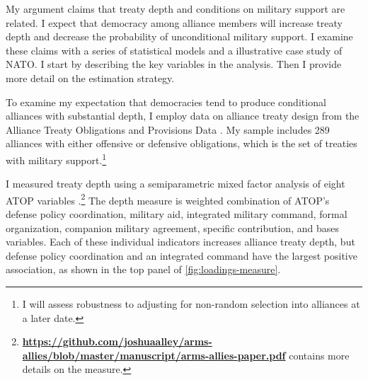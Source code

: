 \documentclass[12pt]{article}
\begin{document}
My argument claims that treaty depth and conditions on military support are related. 
I expect that democracy among alliance members will increase treaty depth and decrease the probability of unconditional military support. 
I examine these claims with a series of statistical models and a illustrative case study of NATO. 
I start by describing the key variables in the analysis. 
Then I provide more detail on the estimation strategy. 


To examine my expectation that democracies tend to produce conditional alliances with substantial depth, I employ data on alliance treaty design from the Alliance Treaty Obligations and Provisions Data \citep{Leedsetal2002}. 
My sample includes 289 alliances with either offensive or defensive obligations, which is the set of treaties with military support.\footnote{I will assess robustness to adjusting for non-random selection into alliances at a later date.} 


I measured treaty depth using a semiparametric mixed factor analysis of eight ATOP variables \citep{Murrayetal2013}.\footnote{\textbf{\url{https://github.com/joshuaalley/arms-allies/blob/master/manuscript/arms-allies-paper.pdf}} contains more details on the measure.}
The depth measure is weighted combination of ATOP's defense policy coordination, military aid, integrated military command, formal organization, companion military agreement, specific contribution, and bases variables. 
Each of these individual indicators increases alliance treaty depth, but defense policy coordination and an integrated command have the largest positive association, as shown in the top panel of \autoref{fig:loadings-measure}. 
\end{document}
